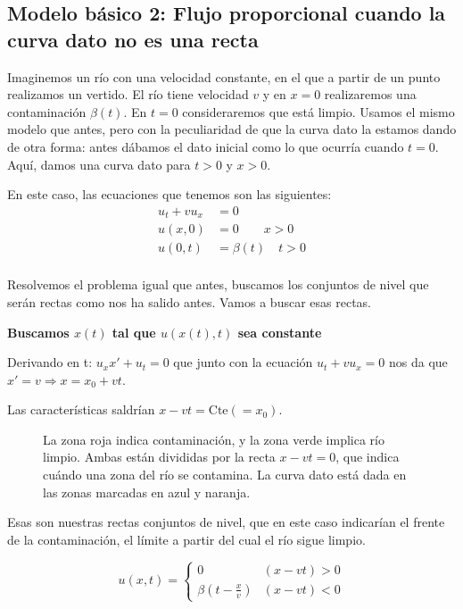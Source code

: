 	\subsection{Modelo básico 2: Flujo proporcional cuando la curva dato no es una recta}

		Imaginemos un río con una velocidad constante, en el que a partir de un punto realizamos un vertido. El río tiene velocidad $v$ y en $x=0$ realizaremos una contaminación $\beta(t)$. En $t=0$ consideraremos que está limpio. Usamos el mismo modelo que antes, pero con la peculiaridad de que la curva dato la estamos dando de otra forma: antes dábamos el dato inicial como lo que ocurría cuando $t = 0$. Aquí, damos una curva dato para $t > 0$ y $x > 0$.

		En este caso, las ecuaciones que tenemos son las siguientes:
		\begin{align*}
		u_t + vu_x &= 0 \\
		u(x,0) &= 0 \qquad x>0 \\
		u(0,t) &= \beta(t)\quad t>0 \\
		\end{align*}

		Resolvemos el problema igual que antes, buscamos los conjuntos de nivel que serán rectas como nos ha salido antes. Vamos a buscar esas rectas.

		\textbf{Buscamos $x(t)$ tal que $u(x(t),t)$ sea constante}

		Derivando en t: $u_x x' + u_t = 0$ que junto con la ecuación $u_t + v u_x = 0$ nos da que $x' = v \Rightarrow x = x_0 + vt $.

		Las características saldrían \(x-vt = \text{Cte}(=x_0) \label{eq:rio_vcte}\).

		\begin{figure}[hbtp]
			\centering
			\caption{La zona roja indica contaminación, y la zona verde implica río limpio. Ambas están divididas por la recta $x - vt = 0$, que indica cuándo una zona del río se contamina. La curva dato está dada en las zonas marcadas en azul y naranja.}
			\label{fig:ContaminacionRio}
		\end{figure}

		Esas son nuestras rectas conjuntos de nivel, que en este caso indicarían el frente de la contaminación, el límite a partir del cual el río sigue limpio.

		$$u(x,t) =
			\begin{cases}
				0                      & (x-vt) > 0 \\
				\beta(t - \frac{x}{v}) & (x-vt) < 0
			\end{cases}
		$$

